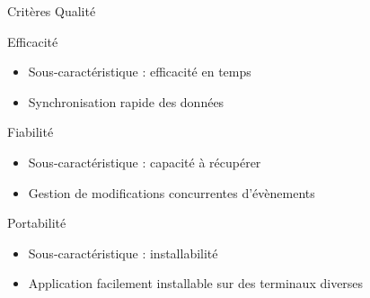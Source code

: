 \begin{frame}{Critères Qualité}
      \begin{block}{Efficacité}
       \begin{itemize}
        \item Sous-caractéristique : efficacité en temps
        \item Synchronisation rapide des données
       \end{itemize}
      \end{block}
      \begin{block}{Fiabilité}
       \begin{itemize}
        \item Sous-caractéristique : capacité à récupérer
        \item Gestion de modifications concurrentes d'évènements
       \end{itemize}
      \end{block}
      \begin{block}{Portabilité}
       \begin{itemize}
        \item Sous-caractéristique : installabilité
        \item Application facilement installable sur des terminaux diverses
       \end{itemize}
      \end{block}
\end{frame}
